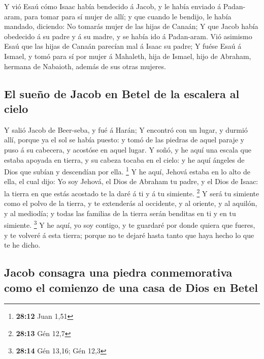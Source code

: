  Y vió Esaú cómo Isaac había bendecido á Jacob, y le había
enviado á Padan-aram, para tomar para sí mujer de allí; y que cuando le
bendijo, le había mandado, diciendo: No tomarás mujer de las hijas de
Canaán;  Y que Jacob había obedecido á su padre y á su
madre, y se había ido á Padan-aram.  Vió asimismo Esaú que
las hijas de Canaán parecían mal á Isaac su padre;  Y fuése
Esaú á Ismael, y tomó para sí por mujer á Mahaleth, hija de Ismael, hijo
de Abraham, hermana de Nabaioth, además de sus otras mujeres.

\hypertarget{el-sueuxf1o-de-jacob-en-betel-de-la-escalera-al-cielo}{%
\subsection{El sueño de Jacob en Betel de la escalera al
cielo}\label{el-sueuxf1o-de-jacob-en-betel-de-la-escalera-al-cielo}}

 Y salió Jacob de Beer-seba, y fué á Harán;  Y
encontró con un lugar, y durmió allí, porque ya el sol se había puesto:
y tomó de las piedras de aquel paraje y puso á su cabecera, y acostóse
en aquel lugar.  Y soñó, y he aquí una escala que estaba
apoyada en tierra, y su cabeza tocaba en el cielo: y he aquí ángeles de
Dios que subían y descendían por ella. \footnote{\textbf{28:12} Juan
  1,51}  Y he aquí, Jehová estaba en lo alto de ella, el
cual dijo: Yo soy Jehová, el Dios de Abraham tu padre, y el Dios de
Isaac: la tierra en que estás acostado te la daré á ti y á tu simiente.
\footnote{\textbf{28:13} Gén 12,7}  Y será tu simiente como
el polvo de la tierra, y te extenderás al occidente, y al oriente, y al
aquilón, y al mediodía; y todas las familias de la tierra serán benditas
en ti y en tu simiente. \footnote{\textbf{28:14} Gén 13,16; Gén 12,3}
 Y he aquí, yo soy contigo, y te guardaré por donde quiera
que fueres, y te volveré á esta tierra; porque no te dejaré hasta tanto
que haya hecho lo que te he dicho.

\hypertarget{jacob-consagra-una-piedra-conmemorativa-como-el-comienzo-de-una-casa-de-dios-en-betel}{%
\subsection{Jacob consagra una piedra conmemorativa como el comienzo de
una casa de Dios en
Betel}\label{jacob-consagra-una-piedra-conmemorativa-como-el-comienzo-de-una-casa-de-dios-en-betel}}

